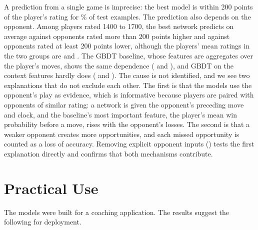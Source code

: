 \documentclass[11pt]{article}
\begin{document}
A prediction from a single game is imprecise: the best model is within 200
points of the player's rating for
\% of test examples. The prediction
also depends on the opponent. Among players rated 1400 to 1700, the best
network predicts  on
average against opponents rated more than 200 points higher and
 against opponents rated
at least 200 points lower, although the players' mean ratings in the two
groups are  and
. The GBDT baseline,
whose features are aggregates over the player's moves, shows the same
dependence (
and ), and GBDT
on the context features hardly does
( and
). The cause
is not identified, and we see two explanations that do not exclude each
other. The first is that the models use the opponent's play as evidence,
which is informative because players are paired with opponents of similar
rating: a network is given the opponent's preceding move and clock, and the
baseline's most important feature, the player's mean win probability before
a move, rises with the opponent's losses. The second is that a weaker
opponent creates more opportunities, and each missed opportunity is counted
as a loss of accuracy. Removing explicit opponent inputs ()
tests the first explanation directly and confirms that both mechanisms
contribute.

\section{Practical Use}
\label{sec:use}

The models were built for a coaching application. The results suggest the
following for deployment.
\end{document}
